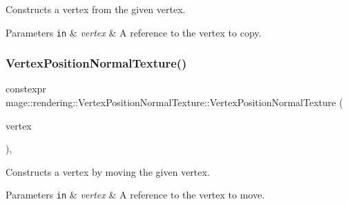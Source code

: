 Constructs a vertex from the given vertex.


\begin{DoxyParams}[1]{Parameters}
\mbox{\tt in}  & {\em vertex} & A reference to the vertex to copy. \\
\hline
\end{DoxyParams}
\hypertarget{structmage_1_1rendering_1_1_vertex_position_normal_texture_a93576bdd7233682f8758a187a6958428}{}\label{structmage_1_1rendering_1_1_vertex_position_normal_texture_a93576bdd7233682f8758a187a6958428} 
\subsubsection{\texorpdfstring{Vertex\+Position\+Normal\+Texture()}{VertexPositionNormalTexture()}\hspace{0.1cm}{\footnotesize\ttfamily [4/4]}}
{\footnotesize\ttfamily constexpr mage\+::rendering\+::\+Vertex\+Position\+Normal\+Texture\+::\+Vertex\+Position\+Normal\+Texture (\begin{DoxyParamCaption}\item[{\hyperlink{structmage_1_1rendering_1_1_vertex_position_normal_texture}{Vertex\+Position\+Normal\+Texture} \&\&}]{vertex }\end{DoxyParamCaption})\hspace{0.3cm}{\ttfamily [default]}, {\ttfamily [noexcept]}}

Constructs a vertex by moving the given vertex.


\begin{DoxyParams}[1]{Parameters}
\mbox{\tt in}  & {\em vertex} & A reference to the vertex to move. \\
\hline
\end{DoxyParams}
\hypertarget{structmage_1_1rendering_1_1_vertex_position_normal_texture_ad776aa49c8bb1ec6bb0468eacd85feac}{}\label{structmage_1_1rendering_1_1_vertex_position_normal_texture_ad776aa49c8bb1ec6bb0468eacd85feac} 

